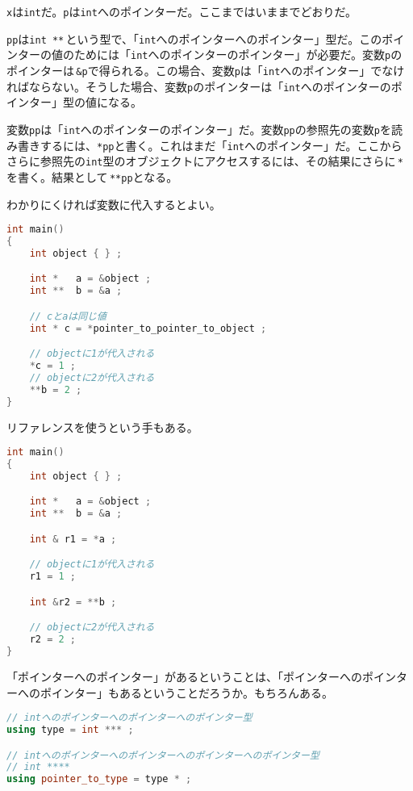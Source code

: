 \texttt{x}は\texttt{int}だ。\texttt{p}は\texttt{int}へのポインターだ。ここまではいままでどおりだ。

\texttt{pp}は\texttt{int **}\,という型で、「\texttt{int}へのポインターへのポインター」型だ。このポインターの値のためには「\texttt{int}へのポインターのポインター」が必要だ。変数\texttt{p}のポインターは\,\texttt{\&p}で得られる。この場合、変数\texttt{p}は「\texttt{int}へのポインター」でなければならない。そうした場合、変数\texttt{p}のポインターは「\texttt{int}へのポインターのポインター」型の値になる。

変数\texttt{pp}は「\texttt{int}へのポインターのポインター」だ。変数\texttt{pp}の参照先の変数\texttt{p}を読み書きするには、\texttt{*pp}と書く。これはまだ「\texttt{int}へのポインター」だ。ここからさらに参照先の\texttt{int}型のオブジェクトにアクセスするには、その結果にさらに\,\texttt{*}\,を書く。結果として\,\texttt{**pp}となる。

わかりにくければ変数に代入するとよい。

\begin{lstlisting}[language={C++}]
int main()
{
    int object { } ;

    int *   a = &object ;
    int **  b = &a ;

    // cとaは同じ値
    int * c = *pointer_to_pointer_to_object ;

    // objectに1が代入される
    *c = 1 ;
    // objectに2が代入される
    **b = 2 ;
}
\end{lstlisting}

リファレンスを使うという手もある。

\begin{lstlisting}[language={C++}]
int main()
{
    int object { } ;

    int *   a = &object ;
    int **  b = &a ;

    int & r1 = *a ;

    // objectに1が代入される
    r1 = 1 ;

    int &r2 = **b ;

    // objectに2が代入される
    r2 = 2 ;
}
\end{lstlisting}

「ポインターへのポインター」があるということは、「ポインターへのポインターへのポインター」もあるということだろうか。もちろんある。

\begin{lstlisting}[language={C++}]
// intへのポインターへのポインターへのポインター型
using type = int *** ;

// intへのポインターへのポインターへのポインターへのポインター型
// int ****
using pointer_to_type = type * ;
\end{lstlisting}

